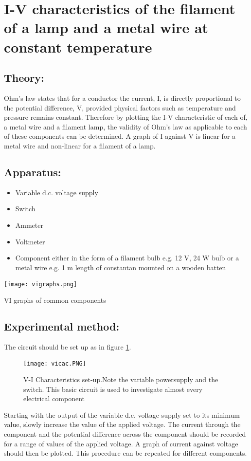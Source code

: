\section{I-V characteristics of the filament of a lamp and a metal wire at constant temperature}
\subsection{Theory:} 
Ohm's law states that for a conductor the current, I, is directly proportional to the potential difference, V, provided physical factors such as temperature and pressure remains constant.  Therefore by plotting the I-V characteristic of each of, a metal wire and a filament lamp, the validity of Ohm's law as applicable to each of these components can be determined. A graph of I against V is linear for a metal wire and non-linear for a filament of a lamp. 
\subsection{Apparatus:}
\begin {itemize}
\item Variable d.c. voltage supply 
\item Switch 
\item Ammeter 
\item Voltmeter 
\item Component either in the form of a filament bulb e.g. 12 V, 24 W bulb or a metal wire e.g. 1 m length of constantan mounted on a wooden batten 
\end{itemize}
\begin{marginfigure}
\texttt{[image: vigraphs.png]}
\caption{VI graphs of common components}
\end{marginfigure}

\subsection{Experimental method:} 
The circuit should be set up as in figure \ref{V-I}.
\begin{figure}
\texttt{[image: vicac.PNG]}
\caption{V-I Characteristics set-up.\newline Note the variable powersupply and the switch. This basic circuit is used to investigate almost every electrical component}
\label{V-I}
\end{figure}

 
Starting with the output of the variable d.c. voltage supply set to its minimum value, slowly increase the value of the applied voltage. The current through the component and the potential difference across the component should be recorded for a range of values of the applied voltage. A graph of current against voltage should then be plotted. This procedure can be repeated for different components.
